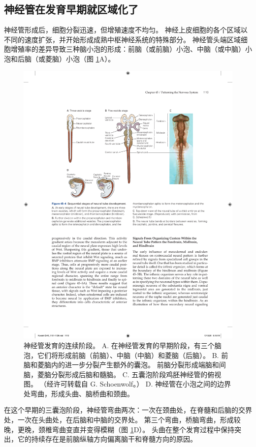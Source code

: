 \subsection{神经管在发育早期就区域化了}
神经管形成后，细胞分裂迅速，但增殖速度不均匀。 神经上皮细胞的各个区域以不同的速度扩张，并开始形成成熟中枢神经系统的特殊部分。 
神经管头端区域细胞增殖率的差异导致三种脑小泡的形成：前脑（或前脑）小泡、中脑（或中脑）小泡和后脑（或菱脑）小泡（图 \ref{fig:45_4}A）。

\begin{figure}[htbp]
	\centering
	\includegraphics[width=0.8\linewidth]{chap45/fig_45_4}
	\caption{神经管发育的连续阶段。 A. 在神经管发育的早期阶段，有三个脑泡，它们将形成前脑（前脑）、中脑（中脑）和菱脑（后脑）。 B. 前脑和菱脑内的进一步分裂产生额外的囊泡。 前脑分裂形成端脑和间脑，菱脑分裂形成后脑和髓脑。 C. 五囊泡阶段鸡胚神经管的俯视图。 （经许可转载自 G. Schoenwolf。） D. 神经管在小泡之间的边界处弯曲，形成头曲、脑桥曲和颈曲。}
	\label{fig:45_4}
\end{figure}

在这个早期的三囊泡阶段，神经管弯曲两次：一次在颈曲处，在脊髓和后脑的交界处，一次在头曲处，在后脑和中脑的交界处。 第三个弯曲，桥脑弯曲，形成较晚，更晚，颈椎弯曲变直并变得模糊（图 \ref{fig:45_4}D）。 头曲在整个发育过程中保持突出，它的持续存在是前脑纵轴方向偏离脑干和脊髓方向的原因。

